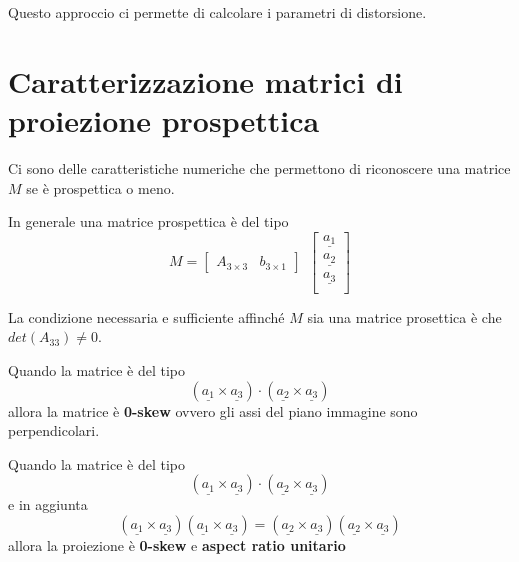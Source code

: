 Questo approccio ci permette di calcolare i parametri di distorsione.

\section{Caratterizzazione matrici di proiezione prospettica}
Ci sono delle caratteristiche numeriche che permettono di riconoscere una matrice 
$M$ se è prospettica o meno.

In generale una matrice prospettica è del tipo
$$M=\left[\begin{array}{c|c}
    A_{3\times3} &b_{3\times1}
\end{array}\right]  \ \ \left[\begin{array}{c}
    \underline{a_1}\\
    \underline{a_2}\\
    \underline{a_3}\\
\end{array}\right]$$

\begin{teorema}
La condizione necessaria e sufficiente affinché $M$ sia una matrice prosettica è
che $det(A_{33})\ne 0$.
\end{teorema}

\begin{teorema}
    Quando la matrice è del tipo
    $$(\underline{a_1} \times \underline{a_3})\cdot (\underline{a_2} \times \underline{a_3})$$
    allora la matrice è \textbf{0-skew} ovvero gli assi del piano immagine sono 
    perpendicolari.
\end{teorema}

\begin{teorema}
    Quando la matrice è del tipo
    $$(\underline{a_1} \times \underline{a_3})\cdot (\underline{a_2} \times \underline{a_3})$$
    e in aggiunta
    $$(\underline{a_1} \times \underline{a_3})(\underline{a_1} \times \underline{a_3}) = (\underline{a_2} \times \underline{a_3})(\underline{a_2} \times \underline{a_3})$$
    allora la proiezione è \textbf{0-skew} e \textbf{aspect ratio unitario}
\end{teorema}



